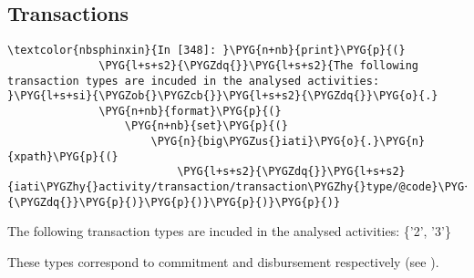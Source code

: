 \documentclass[letterpaper,10pt,english]{sphinxmanual}
\begin{document}
\subsection{Transactions}
\label{\detokenize{Global Affairs Canada - Compliance Report:Transactions}}
\begin{Verbatim}[commandchars=\\\{\}]
\textcolor{nbsphinxin}{In [348]: }\PYG{n+nb}{print}\PYG{p}{(}
              \PYG{l+s+s2}{\PYGZdq{}}\PYG{l+s+s2}{The following transaction types are incuded in the analysed activities: }\PYG{l+s+si}{\PYGZob{}\PYGZcb{}}\PYG{l+s+s2}{\PYGZdq{}}\PYG{o}{.}
              \PYG{n+nb}{format}\PYG{p}{(}
                  \PYG{n+nb}{set}\PYG{p}{(}
                      \PYG{n}{big\PYGZus{}iati}\PYG{o}{.}\PYG{n}{xpath}\PYG{p}{(}
                          \PYG{l+s+s2}{\PYGZdq{}}\PYG{l+s+s2}{iati\PYGZhy{}activity/transaction/transaction\PYGZhy{}type/@code}\PYG{l+s+s2}{\PYGZdq{}}\PYG{p}{)}\PYG{p}{)}\PYG{p}{)}\PYG{p}{)}
\end{Verbatim}
%
\begin{OriginalVerbatim}[commandchars=\\\{\}]
The following transaction types are incuded in the analysed activities: \{'2', '3'\}
\end{OriginalVerbatim}
\relax
These types correspond to commitment and disbursement respectively (see
).
\end{document}
